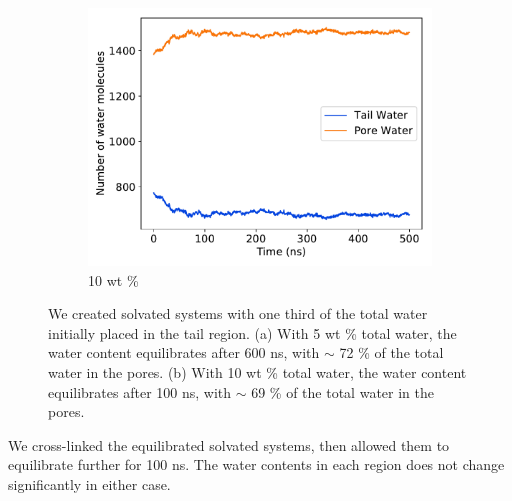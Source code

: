 \documentclass{article}
\begin{document}
\begin{figure}[!htb]
\begin{subfigure}{0.45\textwidth}
  \includegraphics[width=\textwidth]{10wt_offset_equil.pdf}
  \caption{10 wt \%}\label{fig:10wt_offset_equil}
  \end{subfigure}
  \caption{We created solvated systems with one third of the total water
	  initially placed in the tail region. (a) With 5 wt \% total water, the water
	  content equilibrates after 600 ns, with $\sim$ 72 \% of the total water in the
	  pores. (b) With 10 wt \% total water, the water content equilibrates after 100
	  ns, with $\sim$ 69 \% of the total water in the
	  pores.}\label{fig:solvation_equilibration}
  \end{figure}

  We cross-linked the equilibrated solvated systems, then allowed them to 
  equilibrate further for 100 ns. The water contents in each region does not
  change significantly in either case.
\end{document}
